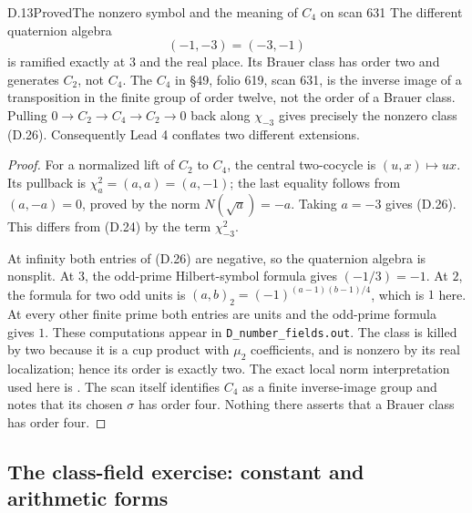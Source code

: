 \begin{statement}{D.13}{Proved}{The nonzero symbol and the meaning of \(C_4\) on scan 631}
The different quaternion algebra
\[
 (-1,-3)=(-3,-1)
 \tag{D.26}
\]
is ramified exactly at \(3\) and the real place.  Its Brauer
class has order two and generates \(C_2\), not \(C_4\).
The \(C_4\) in \S49, folio 619, scan 631, is the inverse
image of a transposition in the finite group of order twelve,
not the order of a Brauer class.  Pulling
\(0\to C_2\to C_4\to C_2\to0\) back along \(\chi_{-3}\)
gives precisely the nonzero class (D.26).
Consequently Lead 4 conflates two different extensions.
\end{statement}
\begin{proof}
For a normalized lift of \(C_2\) to \(C_4\), the central
two-cocycle is \((u,x)\mapsto ux\).
Its pullback is \(\chi_a^2=(a,a)=(a,-1)\);
the last equality follows from \((a,-a)=0\), proved by the
norm \(N(\sqrt a)=-a\).
Taking \(a=-3\) gives (D.26).  This differs from (D.24)
by the term \(\chi_{-3}^2\).

At infinity both entries of (D.26) are negative, so the
quaternion algebra is nonsplit.  At \(3\), the odd-prime
Hilbert-symbol formula gives \((-1/3)=-1\).
At \(2\), the formula for two odd units is
\((a,b)_2=(-1)^{(a-1)(b-1)/4}\), which is \(1\) here.
At every other finite prime both entries are units and the
odd-prime formula gives \(1\).
These computations appear in \texttt{D\_number\_fields.out}.
The class is killed by two because it is a cup product with
\(\mu _2\) coefficients, and is nonzero by its real
localization; hence its order is exactly two.
The exact local norm interpretation used here is
\citet[Chapter III, Theorem 4.4(d)]{D_Milne2020}.
The scan itself identifies \(C_4\) as a finite inverse-image
group and notes that its chosen \(\sigma\) has order four.
Nothing there asserts that a Brauer class has order four.
\end{proof}

\subsection{The class-field exercise: constant and arithmetic forms}

